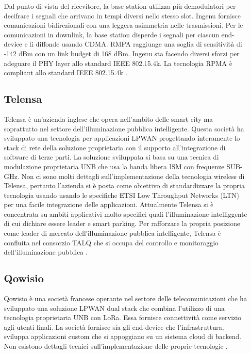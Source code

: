 \documentclass[12pt,a4paper,openright,twoside]{report}
\begin{document}
Dal punto di vista del ricevitore, la base station utilizza pi\`u demodulatori per decifrare i segnali che arrivano in tempi diversi nello stesso slot. 
Ingenu fornisce comunicazioni bidirezionali con una leggera asimmetria nelle trasmissioni. 
Per le comunicazioni in downlink, la base station disperde i segnali per ciascun end-device e li diffonde usando CDMA.
RMPA raggiunge una soglia di sensitivit\`a di -142 dBm con un link budget di 168 dBm.  
Ingenu sta facendo diversi sforzi per adeguare il PHY layer allo standard IEEE 802.15.4k.
La tecnologia RPMA \`e compliant allo standard IEEE 802.15.4k \cite{K2}\cite{K6}.

\subsection{Telensa}
Telensa \`e un'azienda inglese che opera nell'ambito delle smart city ma soprattutto nel settore dell'illuminazione pubblica intelligente. 
Questa societ\`a ha sviluppato una tecnologia per applicazioni LPWAN progettando interamente lo stack di rete della soluzione proprietaria con il supporto all'integrazione di software di terze parti.
La soluzione sviluppata si basa su una tecnica di modulazione proprietaria UNB che usa la banda libera ISM con frequenze SUB-GHz. 
Non ci sono molti dettagli sull'implementazione della tecnologia wireless di Telensa, pertanto l'azienda si \`e posta come obiettivo di standardizzare la propria tecnologia usando usando le specifiche ETSI Low Throughput Networks (LTN) per una facile integrazione delle applicazioni.
Attualmente Telensa si \`e concentrata su ambiti applicativi molto specifici quali l'illuminazione intelliggente di cui dichiare essere leader e smart parking. 
Per rafforzare la propria posizione come leader di mercato dell'illuminazione pubblica intelligente, Telensa \`e confluita nel consorzio TALQ che si occupa del controllo e monitoraggio dell'illuminazione pubblica \cite{K2}.

\subsection{Qowisio}
Qowisio \`e una societ\`a francese operante nel settore delle telecomunicazioni che ha sviluppato una soluzione LPWAN dual stack che combina l'utilizzo di una tecnologia proprietaria UNB con LoRa. 
Essa fornisce connettivit\`a come servizio agli utenti finali.
La societ\`a fornisce sia gli end-device che l'infrastruttura, sviluppa applicazioni custom che si appoggiano su un sistema cloud di backend. 
Non esistono dettagli tecnici sull'implementazione delle proprie tecnologie \cite{K2}.
\end{document}
